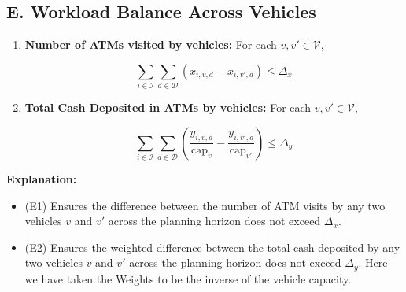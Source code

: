 \documentclass[11pt]{article}
\begin{document}
\subsection*{E. Workload Balance Across Vehicles}
\begin{enumerate}[label=\textbf{(E\arabic*)}]
    \item \textbf{Number of ATMs visited by vehicles:} For each \(v,v' \in \mathcal{V}\),
    
    \[
    \sum_{i \in \mathcal{I}} \sum_{d \in \mathcal{D}} \left(x_{i,v,d} - x_{i,v',d}\right) \le \Delta_x
    \]
    \item \textbf{Total Cash Deposited in ATMs by vehicles:} For each \(v,v' \in \mathcal{V}\),

    \[
        \sum_{i \in \mathcal{I}} \sum_{d \in \mathcal{D}} \left(\frac{y_{i,v,d}}{\text{cap}_v} - \frac{y_{i,v',d}}{\text{cap}_{v'}}\right) \le \Delta_y
    \]
    
\end{enumerate}

\noindent \textbf{Explanation:}
\begin{itemize}[leftmargin=1cm]
    \item (E1) Ensures the difference between the number of ATM visits by any two vehicles \(v\) and \(v'\) across the planning horizon does not exceed \(\Delta_x\).
    \item (E2) Ensures the weighted difference between the total cash deposited by any two vehicles \(v\) and \(v'\) across the planning horizon does not exceed \(\Delta_y\). Here we have taken the Weights to be the inverse of the vehicle capacity.
\end{itemize}
\end{document}
